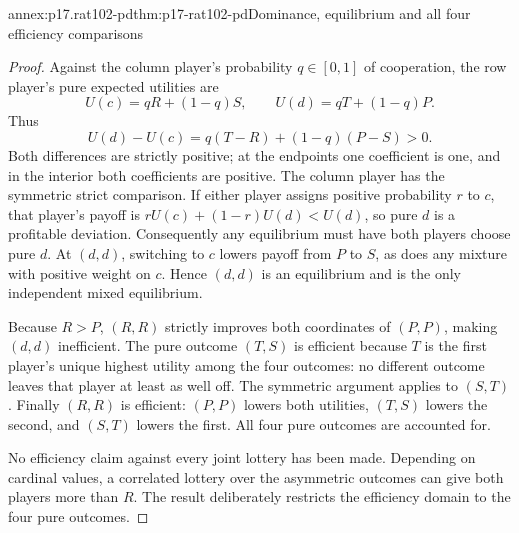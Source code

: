 
\begin{annexitem}{annex:p17.rat102-pd}{thm:p17-rat102-pd}{Dominance, equilibrium and all four efficiency comparisons}
\begin{proof}
Against the column player's probability \(q\in[0,1]\) of cooperation,
the row player's pure expected utilities are
\[
                  U(c)=qR+(1-q)S,\qquad U(d)=qT+(1-q)P.
\]
Thus
\[
              U(d)-U(c)=q(T-R)+(1-q)(P-S)>0.
\]
Both differences are strictly positive; at the endpoints one coefficient
is one, and in the interior both coefficients are positive. The column
player has the symmetric strict comparison. If either player assigns
positive probability \(r\) to \(c\), that player's payoff is
\(rU(c)+(1-r)U(d)<U(d)\), so pure \(d\) is a profitable deviation.
Consequently any equilibrium must have both players choose pure \(d\).
At \((d,d)\), switching to \(c\) lowers payoff from \(P\) to \(S\),
as does any mixture with positive weight on \(c\). Hence \((d,d)\)
is an equilibrium and is the only independent mixed equilibrium.

Because \(R>P\), \((R,R)\) strictly improves both coordinates of
\((P,P)\), making \((d,d)\) inefficient. The pure outcome \((T,S)\)
is efficient because \(T\) is the first player's unique highest utility
among the four outcomes: no different outcome leaves that player at least
as well off. The symmetric argument applies to \((S,T)\). Finally
\((R,R)\) is efficient: \((P,P)\) lowers both utilities, \((T,S)\)
lowers the second, and \((S,T)\) lowers the first. All four pure
outcomes are accounted for.

No efficiency claim against every joint lottery has been made. Depending
on cardinal values, a correlated lottery over the asymmetric outcomes can
give both players more than \(R\). The result deliberately restricts
the efficiency domain to the four pure outcomes.
\end{proof}
\end{annexitem}

